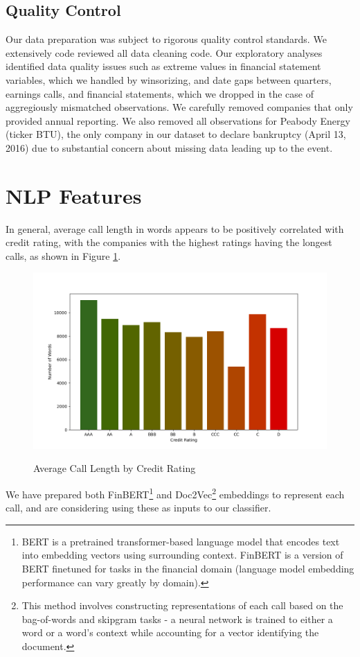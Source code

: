 \documentclass{article}[11pt]
\begin{document}
    \subsection*{Quality Control}

    Our data preparation was subject to rigorous quality control standards. We extensively code reviewed all data cleaning code. Our exploratory analyses identified data quality issues such as extreme values in financial statement variables, which we handled by winsorizing, and date gaps between quarters, earnings calls, and financial statements, which we dropped in the case of aggregiously mismatched observations. We carefully removed companies that only provided annual reporting. We also removed all observations for Peabody Energy (ticker BTU), the only company in our dataset to declare bankruptcy (April 13, 2016) due to substantial concern about missing data leading up to the event.

    \section*{NLP Features}

    In general, average call length in words appears to be positively correlated with credit rating, with the companies with the highest ratings having the longest calls, as shown in Figure \ref{fig:call-length-by-credit-rating}.
    
    \begin{figure}[h!]
		\centering
        \caption{Average Call Length by Credit Rating}
        \includegraphics[width=0.5\linewidth,keepaspectratio=true]{../Output/All Data EDA/NLP EDA/all_data_call_length_by_credit_rating_no_title.png}
        \label{fig:call-length-by-credit-rating}
	\end{figure}

    We have prepared both FinBERT\footnote{BERT is a pretrained transformer-based language model that encodes text into embedding vectors using surrounding context. FinBERT is a version of BERT finetuned for tasks in the financial domain (language model embedding performance can vary greatly by domain).} \citep{araci_finbert_2019} and Doc2Vec\footnote{This method involves constructing representations of each call based on the bag-of-words and skipgram tasks - a neural network is trained to either a word or a word's context while accounting for a vector identifying the document.} \citep{le_distributed_2014} embeddings to represent each call, and are considering using these as inputs to our classifier.
\end{document}
